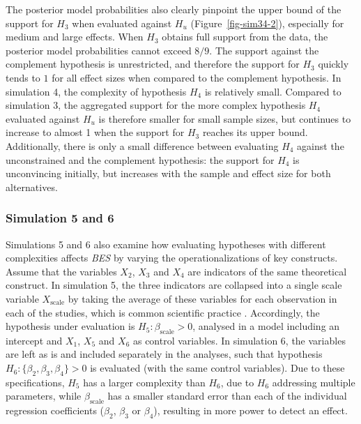\documentclass[
  authoryear,
  preprint,
  5p,
  twocolumn]{elsarticle}
\begin{document}
The posterior model probabilities also clearly pinpoint the upper bound
of the support for \(H_3\) when evaluated against \(H_u\)
(Figure~\ref{fig-sim34-2}), especially for medium and large effects.
When \(H_3\) obtains full support from the data, the posterior model
probabilities cannot exceed \(8/9\). The support against the complement
hypothesis is unrestricted, and therefore the support for \(H_3\)
quickly tends to \(1\) for all effect sizes when compared to the
complement hypothesis. In simulation 4, the complexity of hypothesis
\(H_4\) is relatively small. Compared to simulation 3, the aggregated
support for the more complex hypothesis \(H_4\) evaluated against
\(H_u\) is therefore smaller for small sample sizes, but continues to
increase to almost 1 when the support for \(H_3\) reaches its upper
bound. Additionally, there is only a small difference between evaluating
\(H_4\) against the unconstrained and the complement hypothesis: the
support for \(H_4\) is unconvincing initially, but increases with the
sample and effect size for both alternatives.

\hypertarget{simulation-5-and-6}{%
\subsubsection{Simulation 5 and 6}\label{simulation-5-and-6}}

Simulations 5 and 6 also examine how evaluating hypotheses with
different complexities affects \emph{BES} by varying the
operationalizations of key constructs. Assume that the variables
\(X_2\), \(X_3\) and \(X_4\) are indicators of the same theoretical
construct. In simulation 5, the three indicators are collapsed into a
single scale variable \(X_{\text{scale}}\) by taking the average of
these variables for each observation in each of the studies, which is
common scientific practice \citep{bauer_discrepancy_2016}. Accordingly,
the hypothesis under evaluation is \(H_5: \beta_{\text{scale}} > 0\),
analysed in a model including an intercept and \(X_1\), \(X_5\) and
\(X_6\) as control variables. In simulation 6, the variables are left as
is and included separately in the analyses, such that hypothesis
\(H_6: \{\beta_2,\beta_3,\beta_4\} > 0\) is evaluated (with the same
control variables). Due to these specifications, \(H_5\) has a larger
complexity than \(H_6\), due to \(H_6\) addressing multiple parameters,
while \(\beta_{\text{scale}}\) has a smaller standard error than each of
the individual regression coefficients (\(\beta_2\), \(\beta_3\) or
\(\beta_4\)), resulting in more power to detect an effect.
\end{document}
